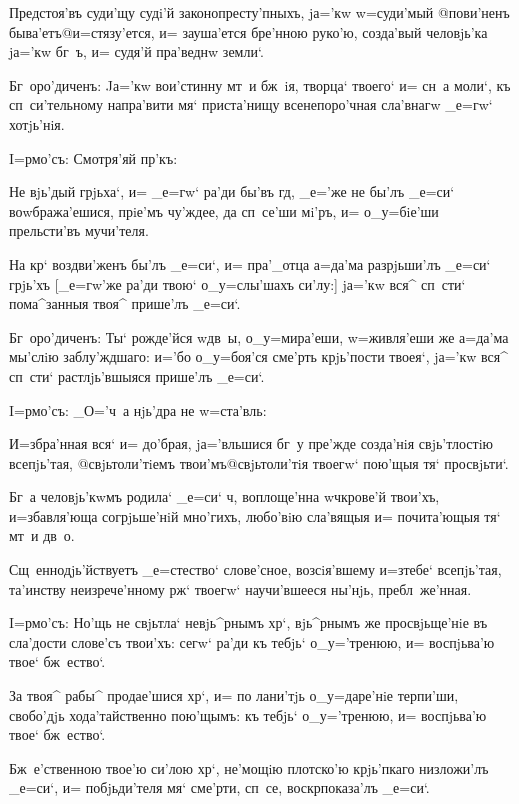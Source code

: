 Предстоя'въ суди'щу судi'й законопресту'пныхъ, jа='кw 
w=суди'мый @пови'ненъ быва'етъ@{и=стязу'ется}, и= 
зауша'ется бре'нною руко'ю, созда'вый человjь'ка jа='кw 
бг~ъ, и= судя'й пра'веднw земли`.

Бг~оро'диченъ: Jа='кw вои'стинну мт~и бж~iя, творца` 
твоего` и= сн~а моли`, къ сп~си'тельному напра'вити мя` 
приста'нищу всенепоро'чная сла'внагw _е=гw` хотjь'нiя.

 I=рмо'съ: Смотря'яй пр'къ:

Не вjь'дый грjьха`, и= _е=гw` ра'ди бы'въ гд, 
_е='же не бы'лъ _е=си` воwбража'ешися, прiе'мъ чу'ждее, 
да сп~се'ши мi'ръ, и= о_у=бiе'ши прельсти'въ мучи'теля.

На кр` воздви'женъ бы'лъ _е=си`, и= пра'_отца 
а=да'ма разрjьши'лъ _е=си` грjь'хъ [_е=гw'же ра'ди твою` 
о_у=слы'шахъ си'лу:] jа='кw вся^ сп~сти` пома^занныя 
твоя^ прише'лъ _е=си`.

Бг~оро'диченъ: Ты` рожде'йся w\т дв~ы, о_у=мира'еши, 
w=живля'еши же а=да'ма мы'слiю заблу'ждшаго: и='бо 
о_у=боя'ся сме'рть крjь'пости твоея`, jа='кw вся^ сп~сти` 
растлjь'вшыяся прише'лъ _е=си`.

 I=рмо'съ: _О='ч~а нjь'дра не w=ста'вль:

И=збра'нная вся` и= до'брая, jа='вльшися бг~у пре'жде 
созда'нiя свjь'тлостiю всепjь'тая, @свjьтоли'тiемъ 
твои'мъ@{свjьтоли'тiя твоегw`} пою'щыя тя` просвjьти`.

Бг~а человjь'кwмъ родила` _е=си` ч, воплоще'нна 
w\т ч крове'й твои'хъ, и=збавля'юща согрjьше'нiй 
мно'гихъ, любо'вiю сла'вящыя и= почита'ющыя тя` мт~и 
дв~о.

Сщ~еннодjь'йствуетъ _е=стество` слове'сное, 
возсiя'вшему и=з\ъ тебе` всепjь'тая, та'инству 
неизрече'нному рж` твоегw` научи'вшееся ны'нjь, 
пребл~же'нная.


I=рмо'съ: Но'щь не свjьтла` невjь^рнымъ хр`, 
вjь^рнымъ же просвjьще'нiе въ сла'дости слове'съ твои'хъ: 
сегw` ра'ди къ тебjь` о_у='тренюю, и= воспjьва'ю твое` 
бж~ество`.

За твоя^ рабы^ продае'шися хр`, и= по лани'тjь 
о_у=даре'нiе терпи'ши, свобо'дjь хода'тайственно 
пою'щымъ: къ тебjь` о_у='тренюю, и= воспjьва'ю твое` 
бж~ество`.

Бж~е'ственною твое'ю си'лою хр`, не'мощiю 
плотско'ю крjь'пкаго низложи'лъ _е=си`, и= побjьди'теля 
мя` сме'рти, сп~се, воскр показа'лъ _е=си`.

